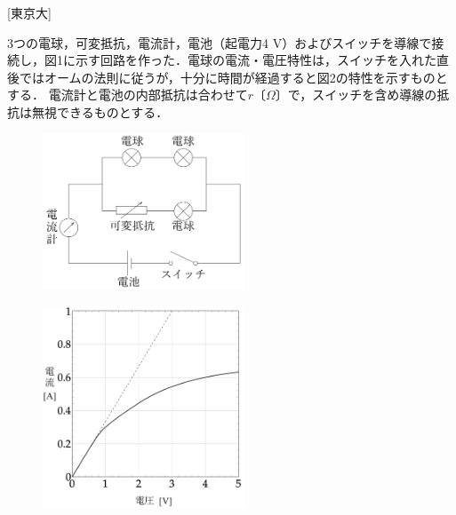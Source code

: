 




\noindent{} [東京大]

3つの電球，可変抵抗，電流計，電池（起電力4 V）およびスイッチを導線で接続し，図1に示す回路を作った．電球の電流・電圧特性は，スイッチを入れた直後ではオームの法則に従うが，十分に時間が経過すると図2の特性を示すものとする．
電流計と電池の内部抵抗は合わせて$r$〔$\Omega$〕で，スイッチを含め導線の抵抗は無視できるものとする．

\begin{minipage}[b]{0.45\linewidth}
  \begin{figure}[H]
    \centering
    \includegraphics[width=6cm]{fig/fig_4_11_1.pdf}
    \caption{}
  \end{figure}
\end{minipage}
\begin{minipage}[b]{0.45\linewidth}
  \begin{figure}[H]
    \centering
    \includegraphics[width=6cm]{fig/fig_4_11_2.pdf}
    \caption{}
  \end{figure}
\end{minipage}



